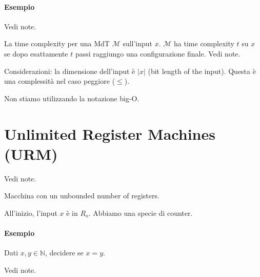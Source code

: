\paragraph{Esempio} Vedi note.


\begin{definition}
    La time complexity per una MdT $\mathcal{M}$ sull'input $x$. $\mathcal{M}$ ha time complexity $t$ su $x$ se dopo esattamente $t$ passi raggiungo una configurazione finale.
    Vedi note.
\end{definition}

Considerazioni: la dimensione dell'input è $|x|$ (bit length of the input). Questa è una complessità nel caso peggiore ($\leq$).

Non stiamo utilizzando la notazione big-O.



\section{Unlimited Register Machines (URM)}

Vedi note.

Macchina con un unbounded number of registers.

All'inizio, l'input $x$ è in $R_o$. Abbiamo una specie di counter.

\paragraph{Esempio} Dati $x,y\in\mathbb{N}$, decidere se $x=y$.

Vedi note. 